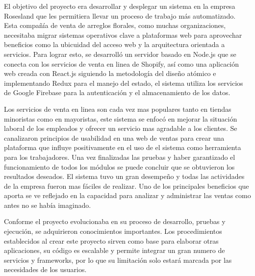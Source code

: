 El objetivo del proyecto era desarrollar y desplegar un sistema en la empresa Rosesland que les permitiera llevar un proceso de trabajo más automatizado. Esta compañía de venta de arreglos florales, como muchas organizaciones, necesitaba migrar sistemas operativos clave a plataformas web para aprovechar beneficios como la ubicuidad del acceso web y la arquitectura orientada a servicios. Para lograr esto, se desarrolló un servidor basado en Node.js que se conecta con los servicios de venta en linea de Shopify, así como una aplicación web creada con React.js siguiendo la metodología del diseño atómico e implementando Redux para el manejo del estado, el sistema utiliza los servicios de Google Firebase para la autenticación y el almacenamiento de los datos.
\vspace{0.8cm}

Los servicios de venta en linea son cada vez mas populares tanto en tiendas minoristas como en mayoristas,  este sistema se enfocó en mejorar la situación laboral de los empleados y ofrecer un servicio mas agradable a los clientes. Se canalizaron principios de usabilidad en una web de ventas para crear una plataforma que influye positivamente en el uso de el sistema como herramienta para los trabajadores. Una vez finalizadas las pruebas y haber garantizado el funcionamiento de todos los módulos se puede concluir que se obtuvieron los resultados deseados. El sistema tuvo un gran desempeño y todas las actividades de la empresa fueron mas fáciles de realizar. Uno de los principales beneficios que aporta se ve reflejado en la capacidad para analizar y administrar las ventas como antes no se había imaginado.
\vspace{0.8cm}

Conforme el proyecto evolucionaba en su proceso de desarrollo, pruebas y ejecución, se adquirieron conocimientos importantes. Los procedimientos establecidos al crear este proyecto sirven como base para elaborar otras aplicaciones, su código es escalable y permite integrar un gran numero de servicios y frameworks, por lo que su limitación solo estará marcada por las necesidades de los usuarios.
\vspace{0.8cm}

